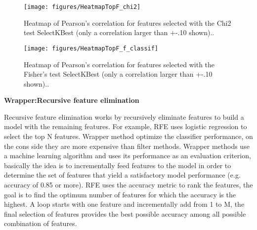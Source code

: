 \documentclass[preprint,12pt]{elsarticle}
\begin{document}
\begin{figure}[!htb]
        \centering
        \texttt{[image: figures/HeatmapTopF\_chi2]}
        \caption{Heatmap of Pearson's correlation for features selected with the Chi2 test SelectKBest \cite{scikit-learn} (only a correlation larger than +-.10 shown)..} 
        \label{fig:HeatmapF_chi2-b}
\end{figure}

\begin{figure}[!htb]
        \centering
        \texttt{[image: figures/HeatmapTopF\_f\_classif]}
        \caption{Heatmap of Pearson's correlation for features selected with the Fisher's test SelectKBest \cite{scikit-learn} (only a correlation larger than +-.10 shown)..} 
        \label{fig:HeatmapTopF_f_classif-b}
\end{figure}



\textbf{Wrapper:Recursive feature elimination}

Recursive feature elimination works by recursively eliminate features to build a model with the  remaining features. For example, RFE uses logistic regression to select the top N features. 
Wrapper method optimize the classifier performance, on the cons side they are more expensive than filter methods.
Wrapper methods use a machine learning algorithm and uses its performance as an evaluation criterion, basically the idea is to incrementally feed features to the model in order to determine the set of features that yield a satisfactory model performance (e.g. accuracy of 0.85 or more). RFE uses the accuracy metric to rank the features, the goal is to find the optimum number of features for which the accuracy is the highest. A loop starts with one feature and incrementally add from 1 to M, the final selection of features provides the best possible accuracy among all possible combination of features.
\end{document}
